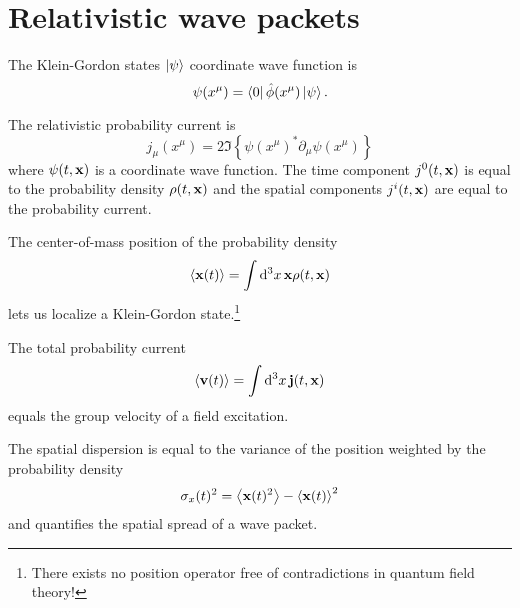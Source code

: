 \section{Relativistic wave packets}

\begin{definition}
	The Klein-Gordon states $\ket{\psi}$ coordinate wave function is
	\begin{equation}
		\psi(x^\mu)
		=
		\bra{0}
		\hat\phi(x^\mu)
		\ket{\psi}
		.
	\end{equation}
\end{definition}
\begin{definition}
	The relativistic probability current is
	\begin{equation}
		j_\mu(x^\mu)
		=
		2
		\Im\left\{
			\psi(x^\mu)^*
			\partial_\mu
			\psi(x^\mu)
		\right\}
		\label{eq:qkg_probability_current}
	\end{equation}
	where $\psi(t,\vb{x})$ is a coordinate wave function.
	The time component $j^0(t,\vb{x})$ is equal to the probability density $\rho(t,\vb{x})$ and the spatial components $j^i(t,\vb{x})$ are equal to the probability current.
\end{definition}
\begin{definition}[Localization]
	The center-of-mass position of the probability density
	\begin{equation}
		\expval{\vb{x}(t)}
		=
		\int\dd[3]{x}
		\vb{x}
		\rho(t,\vb{x})
	\end{equation}
	lets us localize a Klein-Gordon state.\footnote{There exists no position operator free of contradictions in quantum field theory!}
\end{definition}
\begin{definition}
	The total probability current
	\begin{equation}
		\expval{\vb{v}(t)}
		=
		\int\dd[3]{x}
		\vb{j}(t,\vb{x})
		\label{eq:group_velocity}
	\end{equation}
	equals the group velocity of a field excitation.
\end{definition}
\begin{definition}
	The spatial dispersion is equal to the variance of the position weighted by the probability density
	\begin{equation}
		\sigma_x(t)^2
		=
		\expval{\vb{x}(t)^2}
		-
		\expval{\vb{x}(t)}^2
	\end{equation}
	and quantifies the spatial spread of a wave packet.
\end{definition}


